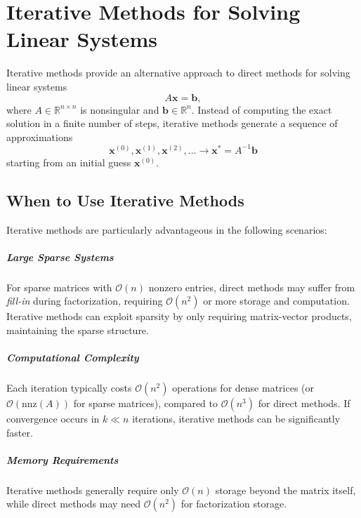 \chapter{Iterative Methods for Solving Linear Systems}

Iterative methods provide an alternative approach to direct methods for solving linear systems
\begin{equation}
    A\mathbf{x} = \mathbf{b},
    \label{eq:linsys}
\end{equation}
where $A \in \mathbb{R}^{n \times n}$ is nonsingular and $\mathbf{b} \in \mathbb{R}^n$. Instead of computing the exact solution in a finite number of steps, iterative methods generate a sequence of approximations
\begin{equation}
    \mathbf{x}^{(0)}, \mathbf{x}^{(1)}, \mathbf{x}^{(2)}, \ldots \to \mathbf{x}^* = A^{-1}\mathbf{b}
\end{equation}
starting from an initial guess $\mathbf{x}^{(0)}$.

\section{When to Use Iterative Methods}

Iterative methods are particularly advantageous in the following scenarios:

\paragraph{Large Sparse Systems}
For sparse matrices with $\mathcal{O}(n)$ nonzero entries, direct methods may suffer from \emph{fill-in} during factorization, requiring $\mathcal{O}(n^2)$ or more storage and computation. Iterative methods can exploit sparsity by only requiring matrix-vector products, maintaining the sparse structure.

\paragraph{Computational Complexity}
Each iteration typically costs $\mathcal{O}(n^2)$ operations for dense matrices (or $\mathcal{O}(\text{nnz}(A))$ for sparse matrices), compared to $\mathcal{O}(n^3)$ for direct methods. If convergence occurs in $k \ll n$ iterations, iterative methods can be significantly faster.

\paragraph{Memory Requirements}
Iterative methods generally require only $\mathcal{O}(n)$ storage beyond the matrix itself, while direct methods may need $\mathcal{O}(n^2)$ for factorization storage.

